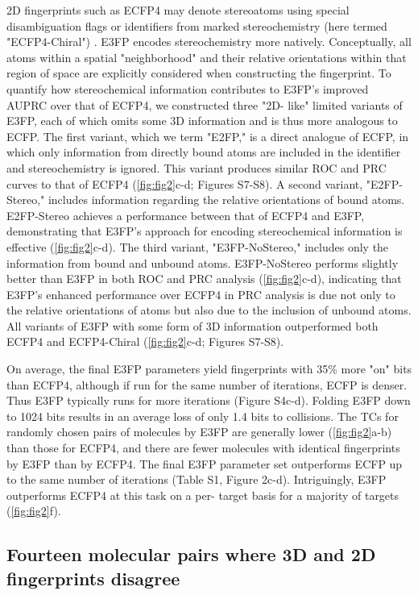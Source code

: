 \documentclass[../../main.tex]{subfiles}
\begin{document}
\begin{refsection}
	2D fingerprints such as ECFP4 may denote stereoatoms using special disambiguation flags or identifiers from marked stereochemistry (here termed "ECFP4-Chiral") \supercite{rogers_2010}.
	E3FP encodes stereochemistry more natively.
	Conceptually, all atoms within a spatial "neighborhood" and their relative orientations within that region of space are explicitly considered when constructing the fingerprint.
	To quantify how stereochemical information contributes to E3FP's improved AUPRC over that of ECFP4, we constructed three "2D- like" limited variants of E3FP, each of which omits some 3D information and is thus more analogous to ECFP.
	The first variant, which we term "E2FP," is a direct analogue of ECFP, in which only information from directly bound atoms are included in the identifier and stereochemistry is ignored.
	This variant produces similar ROC and PRC curves to that of ECFP4 (\cref{fig:fig2}c-d; Figures S7-S8).
	A second variant, "E2FP-Stereo," includes information regarding the relative orientations of bound atoms.
	E2FP-Stereo achieves a performance between that of ECFP4 and E3FP, demonstrating that E3FP's approach for encoding stereochemical information is effective (\cref{fig:fig2}c-d).
	The third variant, "E3FP-NoStereo," includes only the information from bound and unbound atoms.
	E3FP-NoStereo performs slightly better than E3FP in both ROC and PRC analysis (\cref{fig:fig2}c-d), indicating that E3FP's enhanced performance over ECFP4 in PRC analysis is due not only to the relative orientations of atoms but also due to the inclusion of unbound atoms.
	All variants of E3FP with some form of 3D information outperformed both ECFP4 and ECFP4-Chiral (\cref{fig:fig2}c-d; Figures S7-S8).

	On average, the final E3FP parameters yield fingerprints with 35\% more "on" bits than ECFP4, although if run for the same number of iterations, ECFP is denser.
	Thus E3FP typically runs for more iterations (Figure S4c-d).
	Folding E3FP down to 1024 bits results in an average loss of only 1.4 bits to collisions.
	The TCs for randomly chosen pairs of molecules by E3FP are generally lower (\cref{fig:fig2}a-b) than those for ECFP4, and there are fewer molecules with identical fingerprints by E3FP than by ECFP4.
	The final E3FP parameter set outperforms ECFP up to the same number of iterations (Table S1, Figure 2c-d).
	Intriguingly, E3FP outperforms ECFP4 at this task on a per- target basis for a majority of targets (\cref{fig:fig2}f).

	\subsection*{Fourteen molecular pairs where 3D and 2D fingerprints disagree}


\end{refsection}
\end{document}
